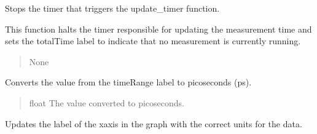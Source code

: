 \documentclass[letterpaper,10pt,english]{sphinxmanual}
\begin{document}
\begin{fulllineitems}
\begin{fulllineitems}
\begin{quote}
\begin{description}
\end{description}\end{quote}

\end{fulllineitems}


\begin{fulllineitems}
\label{\detokenize{FLIMGraphics:FLIMGraphics.FLIMGraphic.stopTimer}}
\pysigstartsignatures
{}
\pysigstopsignatures
\sphinxAtStartPar
Stops the timer that triggers the update\_timer function.

\sphinxAtStartPar
This function halts the timer responsible for updating the measurement time
and sets the totalTime label to indicate that no measurement is currently running.
\begin{quote}\begin{description}
\sphinxAtStartPar
None

\end{description}\end{quote}

\end{fulllineitems}


\begin{fulllineitems}
\label{\detokenize{FLIMGraphics:FLIMGraphics.FLIMGraphic.timeRangeValue}}
\pysigstartsignatures
{}
\pysigstopsignatures
\sphinxAtStartPar
Converts the value from the timeRange label to picoseconds (ps).
\begin{quote}\begin{description}
\sphinxAtStartPar
float
The value converted to picoseconds.

\end{description}\end{quote}

\end{fulllineitems}


\begin{fulllineitems}
\label{\detokenize{FLIMGraphics:FLIMGraphics.FLIMGraphic.updateLabel}}
\pysigstartsignatures
{}
\pysigstopsignatures
\sphinxAtStartPar
Updates the label of the x\sphinxhyphen{}axis in the graph with the correct units for the data.


\end{fulllineitems}
\end{fulllineitems}
\end{document}
